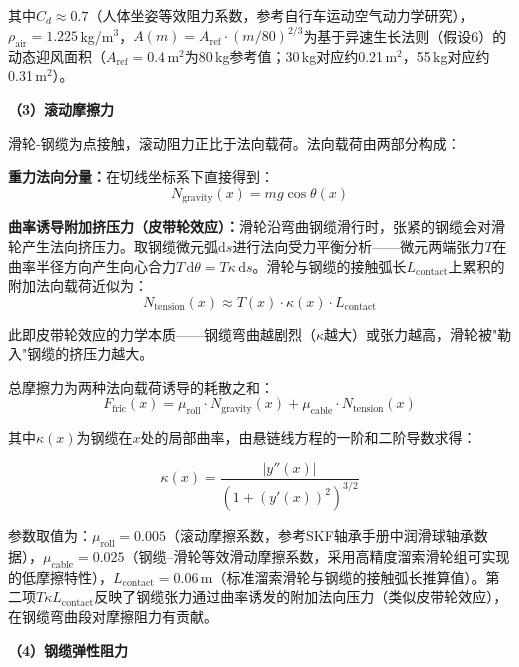 \documentclass[12pt,a4paper]{ctexart}
\begin{document}
其中$C_d \approx 0.7$（人体坐姿等效阻力系数，参考自行车运动空气动力学研究），$\rho_{\text{air}} = 1.225$\,kg/m$^3$，$A(m) = A_{\text{ref}} \cdot (m/80)^{2/3}$为基于异速生长法则（假设6）的动态迎风面积（$A_{\text{ref}}=0.4$\,m$^2$为80\,kg参考值；30\,kg对应约0.21\,m$^2$，55\,kg对应约0.31\,m$^2$）。

\textbf{（3）滚动摩擦力}

滑轮-钢缆为点接触，滚动阻力正比于法向载荷。法向载荷由两部分构成：

\textbf{重力法向分量：}在切线坐标系下直接得到：
\begin{equation}
  N_{\text{gravity}}(x) = mg\cos\theta(x)
  \label{eq:normal_force}
\end{equation}

\textbf{曲率诱导附加挤压力（皮带轮效应）：}滑轮沿弯曲钢缆滑行时，张紧的钢缆会对滑轮产生法向挤压力。取钢缆微元弧$\mathrm{d}s$进行法向受力平衡分析——微元两端张力$T$在曲率半径方向产生向心合力$T\,\mathrm{d}\theta = T\kappa\,\mathrm{d}s$。滑轮与钢缆的接触弧长$L_{\text{contact}}$上累积的附加法向载荷近似为：
\begin{equation}
  N_{\text{tension}}(x) \approx T(x)\cdot\kappa(x)\cdot L_{\text{contact}}
  \label{eq:tension_normal}
\end{equation}

此即皮带轮效应的力学本质——钢缆弯曲越剧烈（$\kappa$越大）或张力越高，滑轮被"勒入"钢缆的挤压力越大。

总摩擦力为两种法向载荷诱导的耗散之和：
\begin{equation}
  F_{\text{fric}}(x) = \mu_{\text{roll}}\cdot N_{\text{gravity}}(x) + \mu_{\text{cable}}\cdot N_{\text{tension}}(x)
  \label{eq:friction_roll}
\end{equation}

其中$\kappa(x)$为钢缆在$x$处的局部曲率，由悬链线方程的一阶和二阶导数求得：

\begin{equation}
  \kappa(x) = \frac{|y''(x)|}{\left(1 + (y'(x))^2\right)^{3/2}}
  \label{eq:curvature}
\end{equation}

参数取值为：$\mu_{\text{roll}} = 0.005$（滚动摩擦系数，参考SKF轴承手册中润滑球轴承数据），$\mu_{\text{cable}} = 0.025$（钢缆--滑轮等效滑动摩擦系数，采用高精度溜索滑轮组可实现的低摩擦特性），$L_{\text{contact}}=0.06$\,m（标准溜索滑轮与钢缆的接触弧长推算值）。第二项$T\kappa L_{\text{contact}}$反映了钢缆张力通过曲率诱发的附加法向压力（类似皮带轮效应），在钢缆弯曲段对摩擦阻力有贡献。

\textbf{（4）钢缆弹性阻力}
\end{document}
